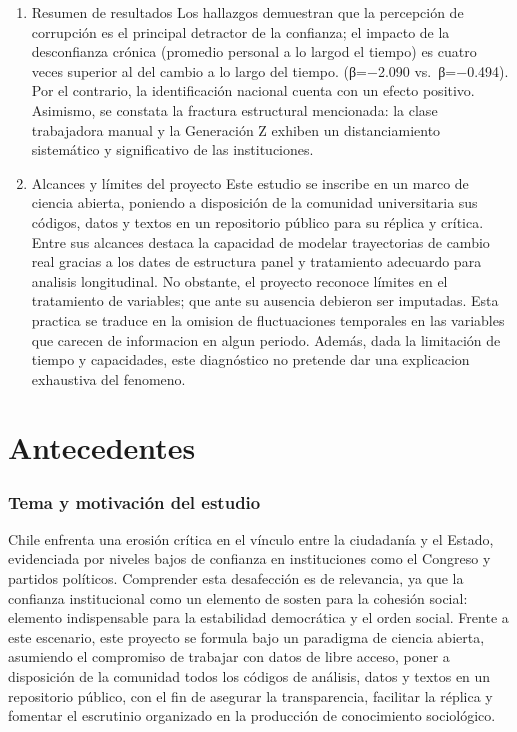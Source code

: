 \documentclass[
  spanish,
  a4paper,
  oneside]{scrbook}
\begin{document}
\begin{enumerate}
\item
  Resumen de resultados Los hallazgos demuestran que la percepción de
  corrupción es el principal detractor de la confianza; el impacto de la
  desconfianza crónica (promedio personal a lo largod el tiempo) es
  cuatro veces superior al del cambio a lo largo del tiempo. (β=−2.090
  vs.~β=−0.494). Por el contrario, la identificación nacional cuenta con
  un efecto positivo. Asimismo, se constata la fractura estructural
  mencionada: la clase trabajadora manual y la Generación Z exhiben un
  distanciamiento sistemático y significativo de las instituciones.
\item
  Alcances y límites del proyecto Este estudio se inscribe en un marco
  de ciencia abierta, poniendo a disposición de la comunidad
  universitaria sus códigos, datos y textos en un repositorio público
  para su réplica y crítica. Entre sus alcances destaca la capacidad de
  modelar trayectorias de cambio real gracias a los dates de estructura
  panel y tratamiento adecuardo para analisis longitudinal. No obstante,
  el proyecto reconoce límites en el tratamiento de variables; que ante
  su ausencia debieron ser imputadas. Esta practica se traduce en la
  omision de fluctuaciones temporales en las variables que carecen de
  informacion en algun periodo. Además, dada la limitación de tiempo y
  capacidades, este diagnóstico no pretende dar una explicacion
  exhaustiva del fenomeno.
\end{enumerate}


\chapter{Antecedentes}\label{antecedentes}

\subsection{Tema y motivación del
estudio}\label{tema-y-motivaciuxf3n-del-estudio}

Chile enfrenta una erosión crítica en el vínculo entre la ciudadanía y
el Estado, evidenciada por niveles bajos de confianza en instituciones
como el Congreso y partidos políticos. Comprender esta desafección es de
relevancia, ya que la confianza institucional como un elemento de sosten
para la cohesión social: elemento indispensable para la estabilidad
democrática y el orden social. Frente a este escenario, este proyecto se
formula bajo un paradigma de ciencia abierta, asumiendo el compromiso de
trabajar con datos de libre acceso, poner a disposición de la comunidad
todos los códigos de análisis, datos y textos en un repositorio público,
con el fin de asegurar la transparencia, facilitar la réplica y fomentar
el escrutinio organizado en la producción de conocimiento sociológico.
\end{document}
